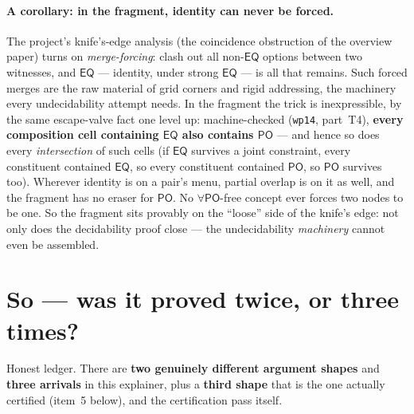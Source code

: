 \documentclass[11pt]{article}
\newcommand{\PO}{\ensuremath{\mathsf{PO}}}
\newcommand{\EQ}{\ensuremath{\mathsf{EQ}}}
\newcommand{\code}[1]{\texttt{#1}}
\begin{document}
\paragraph{A corollary: in the fragment, identity can never be forced.}
The project's knife's-edge analysis (the coincidence obstruction of the
overview paper) turns on \emph{merge-forcing}: clash out all
non-$\EQ$ options between two witnesses, and $\EQ$ --- identity, under
strong $\EQ$ --- is all that remains. Such forced merges are the raw
material of grid corners and rigid addressing, the machinery every
undecidability attempt needs. In the fragment the trick is
inexpressible, by the same escape-valve fact one level up:
machine-checked (\code{wp14}, part~T4), \textbf{every composition cell
containing $\EQ$ also contains $\PO$} --- and hence so does every
\emph{intersection} of such cells (if $\EQ$ survives a joint
constraint, every constituent contained $\EQ$, so every constituent
contained $\PO$, so $\PO$ survives too). Wherever identity is on a
pair's menu, partial overlap is on it as well, and the fragment has no
eraser for $\PO$. No $\forall\PO$-free concept ever forces two nodes to
be one. So the fragment sits provably on the ``loose'' side of the
knife's edge: not only does the decidability proof close --- the
undecidability \emph{machinery} cannot even be assembled.

\section{So --- was it proved twice, or three times?}\label{sec:ledger}

Honest ledger. There are \textbf{two genuinely different argument
shapes} and \textbf{three arrivals} in this explainer, plus a \textbf{third
shape} that is the one actually certified (item~5 below), and the
certification pass itself.
\end{document}
